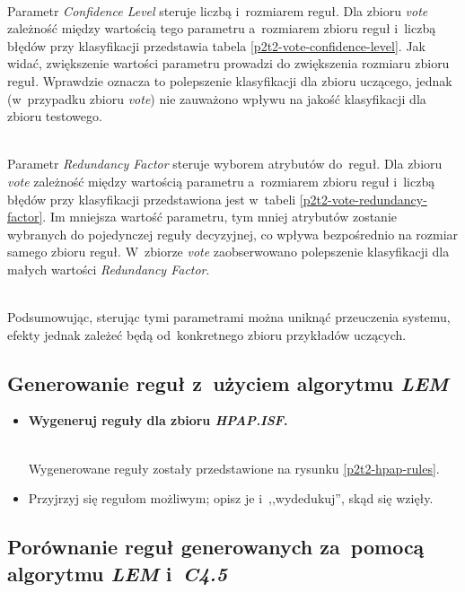 \begin{itemize}
	
	\\Parametr \emph{Confidence Level} steruje liczbą i~rozmiarem reguł. Dla zbioru \emph{vote} zależność między wartością tego parametru a~rozmiarem zbioru reguł i~liczbą błędów przy klasyfikacji przedstawia tabela \ref{p2t2-vote-confidence-level}. Jak widać, zwiększenie wartości parametru prowadzi do zwiększenia rozmiaru zbioru reguł. Wprawdzie oznacza to polepszenie klasyfikacji dla zbioru uczącego, jednak (w~przypadku zbioru \emph{vote}) nie zauważono wpływu na jakość klasyfikacji dla zbioru testowego.

	
	\\Parametr \emph{Redundancy Factor} steruje wyborem atrybutów do~reguł. Dla zbioru \emph{vote} zależność między wartością parametru a~rozmiarem zbioru reguł i~liczbą błędów przy klasyfikacji przedstawiona jest w~tabeli \ref{p2t2-vote-redundancy-factor}. Im mniejsza wartość parametru, tym mniej atrybutów zostanie wybranych do pojedynczej reguły decyzyjnej, co wpływa bezpośrednio na rozmiar samego zbioru reguł. W~zbiorze \emph{vote} zaobserwowano polepszenie klasyfikacji dla małych wartości \emph{Redundancy Factor}.

	\\Podsumowując, sterując tymi parametrami można uniknąć przeuczenia systemu, efekty jednak zależeć będą od~konkretnego zbioru przykładów uczących.
\end{itemize}


	\subsection{Generowanie reguł z~użyciem algorytmu \emph{LEM}}

\begin{itemize}
\item \textbf{Wygeneruj reguły dla zbioru \emph{HPAP.ISF}.}

	
	\\Wygenerowane reguły zostały przedstawione na rysunku \ref{p2t2-hpap-rules}.

\item Przyjrzyj się regułom możliwym; opisz je i~,,wydedukuj'', skąd się wzięły.
\end{itemize}

\subsection{Porównanie reguł generowanych za~pomocą algorytmu \emph{LEM} i~\emph{C4.5}}

